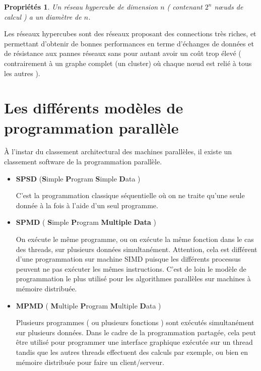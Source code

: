 \documentclass[fleqn,11pt]{article}
\newtheorem{prop}{Propriétés}
\begin{document}
\begin{prop}
Un réseau hypercube de dimension $n$ ( contenant $2^{n}$ nœuds de calcul ) a un diamètre de $n$.
\end{prop}

Les réseaux hypercubes sont des réseaux proposant des connections très riches,
et permettant d'obtenir de bonnes performances en terme d'échanges de données
et de résistance aux pannes réseaux sans pour autant avoir un coût trop élevé 
( contrairement à un graphe complet (un cluster) où chaque nœud est relié à tous les autres ).

\section{Les différents modèles de programmation parallèle}

À l'instar du classement architectural des machines parallèles, il existe
un classement software de la programmation parallèle.

\begin{itemize}
\item \textbf{SPSD} ({\bf S}imple {\bf P}rogram {\bf S}imple {\bf D}ata )

C'est la programmation classique séquentielle où on ne traite qu'une seule
donnée à la fois à l'aide d'un seul programme. 

\item \textbf{SPMD} ( {\bf S}imple {\bf P}rogram {\bf Multiple} {\bf Data} )

On exécute le même programme, ou on exécute la même fonction dans le cas des threads,
sur plusieurs données simultanément. Attention, cela est différent d'une programmation
sur machine SIMD puisque les différents processus peuvent ne pas exécuter les mêmes
instructions. C'est de loin le modèle de programmation le plus utilisé pour les
algorithmes parallèles sur machines à mémoire distribuée.

\item \textbf{MPMD} ( {\bf M}ultiple {\bf P}rogram {\bf M}ultiple {\bf D}ata )

Plusieurs programmes ( ou plusieurs fonctions ) sont exécutés simultanément
sur plusieurs données. Dans le cadre de la programmation partagée, cela peut être
utilisé pour programmer une interface graphique exécutée sur un thread tandis
que les autres threads effectuent des calculs par exemple, ou bien en mémoire
distribuée pour faire un client/serveur.
\end{itemize}
\end{document}
